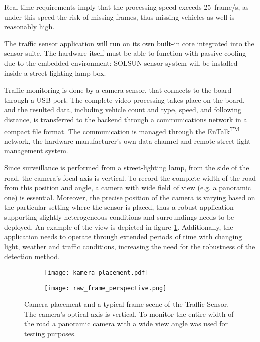 Real-time requirements imply that the processing speed exceeds \SI{25}{frame/s}, as under this speed the risk of missing frames, thus missing vehicles as well is reasonably high.

The traffic sensor application will run on its own built-in core integrated into the sensor suite.
The hardware itself must be able to function with passive cooling due to the embedded environment: SOLSUN sensor system will be installed inside a street-lighting lamp box.

Traffic monitoring is done by a camera sensor, that connects to the board through a USB port.
The complete video processing takes place on the board, and the resulted data, including vehicle count and type, speed, and following distance, is transferred to the backend through a communications network in a compact file format.
The communication is managed through the EnTalk\textsuperscript{TM} network, the hardware manufacturer's own data channel and remote street light management system\cite{EnTalk}.

Since surveillance is performed from a street-lighting lamp, from the side of the road, the camera's focal axis is vertical.
To record the complete width of the road from this position and angle, a camera with wide field of view (e.g. a panoramic one) is essential.
Moreover, the precise position of the camera is varying based on the particular setting where the sensor is placed, thus a robust application supporting slightly heterogeneous conditions and surroundings needs to be deployed. 
An example of the view is depicted in figure \ref{fig:camera_position}.
Additionally, the application needs to operate through extended periods of time with changing light, weather and traffic conditions, increasing the need for the robustness of the detection method.

\begin{figure}
	\centering
	\begin{subfigure}{.5\textwidth}
		\centering
		\texttt{[image: kamera\_placement.pdf]}
	\end{subfigure}%
	\begin{subfigure}{.5\textwidth}
		\centering
		\texttt{[image: raw\_frame\_perspective.png]}
	\end{subfigure}
	\caption{Camera placement and a typical frame scene of the Traffic Sensor. The camera's optical axis is vertical. To monitor the entire width of the road a panoramic camera with a wide view angle was used for testing purposes.}
	\label{fig:camera_position}
\end{figure}

